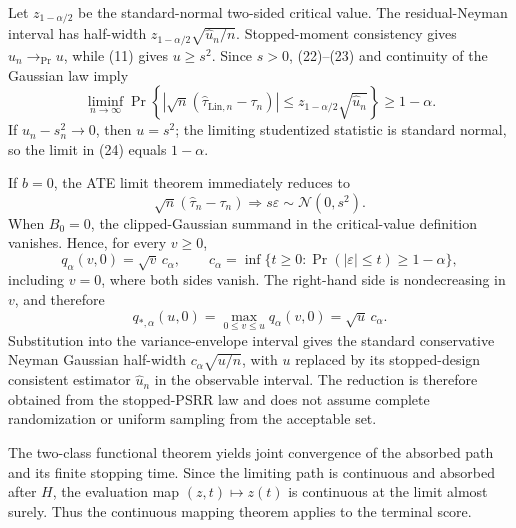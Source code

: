 Let \(z_{1-\alpha/2}\) be the standard-normal two-sided critical value.  The residual-Neyman interval has half-width \(z_{1-\alpha/2}\sqrt{\widehat u_n/n}\).  Stopped-moment consistency gives \(\widehat u_n\to_{\Pr}u\), while (11) gives \(u\ge s^2\).  Since \(s>0\), (22)--(23) and continuity of the Gaussian law imply
\[
 \liminf_{n\to\infty}\Pr\!\left\{
 |\sqrt n(\widehat\tau_{\mathrm{Lin},n}-\tau_n)|
 \le z_{1-\alpha/2}\sqrt{\widehat u_n}\right\}\ge1-\alpha. \tag{24}
\]
If \(u_n-s_n^2\to0\), then \(u=s^2\); the limiting studentized statistic is standard normal, so the limit in (24) equals \(1-\alpha\).

If \(b=0\), the ATE limit theorem immediately reduces to
\[
 \sqrt n(\widehat\tau_n-\tau_n)\Rightarrow s\varepsilon
 \sim\mathcal N(0,s^2). \tag{25}
\]
When \(B_0=0\), the clipped-Gaussian summand in the critical-value definition vanishes.  Hence, for every \(v\ge0\),
\[
 q_\alpha(v,0)=\sqrt v\,c_\alpha,
 \qquad
 c_\alpha=\inf\{t\ge0:\Pr(|\varepsilon|\le t)\ge1-\alpha\}, \tag{26}
\]
including \(v=0\), where both sides vanish.  The right-hand side is nondecreasing in \(v\), and therefore
\[
 q_{*,\alpha}(u,0)
 =\max_{0\le v\le u}q_\alpha(v,0)
 =\sqrt u\,c_\alpha. \tag{27}
\]
Substitution into the variance-envelope interval gives the standard conservative Neyman Gaussian half-width \(c_\alpha\sqrt{u/n}\), with \(u\) replaced by its stopped-design consistent estimator \(\widehat u_n\) in the observable interval.  The reduction is therefore obtained from the stopped-PSRR law and does not assume complete randomization or uniform sampling from the acceptable set.

The two-class functional theorem yields joint convergence of the absorbed path and its finite stopping time.  Since the limiting path is continuous and absorbed after \(H\), the evaluation map \((z,t)\mapsto z(t)\) is continuous at the limit almost surely.  Thus the continuous mapping theorem applies to the terminal score.

